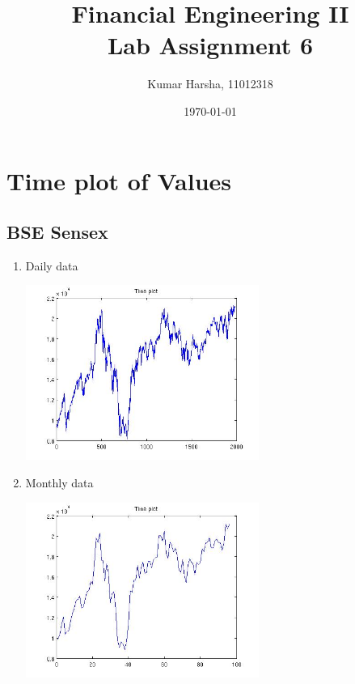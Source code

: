\documentclass[12pt]{article}
\begin{document}
\title{Financial Engineering II\\Lab Assignment 6}
\author{Kumar Harsha, 11012318}
\date{\today}
\maketitle
\tableofcontents
\newpage

\section{Time plot of Values}
  \subsection*{BSE Sensex}
  \begin{enumerate}
    \item Daily data
      \begin{center}
        \includegraphics[width=3in]{sensexdaily.jpg}
      \end{center}
    \item Monthly data
      \begin{center}
        \includegraphics[width=3in]{sensexmonthly.jpg}
      \end{center}
  \end{enumerate}
  
\end{document}
